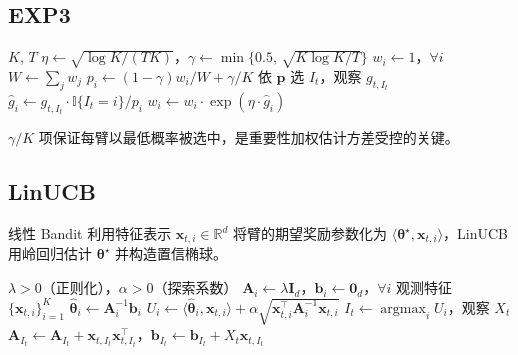 \documentclass[UTF8,a4paper,11pt,zihao=5]{ctexart}
\newcommand{\R}{\mathbb{R}}
\newcommand{\ind}{\mathbb{I}}
\newcommand{\argmax}{\mathop{\arg\max}}
\begin{document}
\subsection{EXP3}

\begin{algorithm}[htbp]
\caption{EXP3}
\label{alg:exp3}
\begin{algorithmic}[1]
\Require $K$, $T$
\State $\eta \leftarrow \sqrt{\log K / (TK)}$，$\gamma \leftarrow \min\{0.5,\, \sqrt{K\log K / T}\}$
\State $w_i \leftarrow 1$，$\forall i$
    \State $W \leftarrow \sum_j w_j$
     \State $p_i \leftarrow (1-\gamma) w_i / W + \gamma/K$ \EndFor
    \State 依 $\bm{p}$ 选 $I_t$，观察 $g_{t,I_t}$
     \State $\hat{g}_i \leftarrow g_{t,I_t} \cdot \ind\{I_t=i\} / p_i$ \EndFor
     \State $w_i \leftarrow w_i \cdot \exp(\eta \cdot \hat{g}_i)$ \EndFor
\EndFor
\end{algorithmic}
\end{algorithm}

$\gamma/K$ 项保证每臂以最低概率被选中，是重要性加权估计方差受控的关键。

\subsection{LinUCB}

线性 Bandit 利用特征表示 $\bm{x}_{t,i} \in \R^d$ 将臂的期望奖励参数化为 $\langle \bm{\theta}^\star, \bm{x}_{t,i} \rangle$，LinUCB 用岭回归估计 $\bm{\theta}^\star$ 并构造置信椭球。

\begin{algorithm}[htbp]
\caption{LinUCB（不相交模型）}
\label{alg:linucb}
\begin{algorithmic}[1]
\Require $\lambda > 0$（正则化），$\alpha > 0$（探索系数）
\State $\bm{A}_i \leftarrow \lambda \bm{I}_d$，$\bm{b}_i \leftarrow \bm{0}_d$，$\forall i$
    \State 观测特征 $\{\bm{x}_{t,i}\}_{i=1}^{K}$
        \State $\hat{\bm{\theta}}_i \leftarrow \bm{A}_i^{-1} \bm{b}_i$
        \State $U_i \leftarrow \langle \hat{\bm{\theta}}_i, \bm{x}_{t,i} \rangle + \alpha\sqrt{\bm{x}_{t,i}^\top \bm{A}_i^{-1} \bm{x}_{t,i}}$
    \EndFor
    \State $I_t \leftarrow \argmax_i U_i$，观察 $X_t$
    \State $\bm{A}_{I_t} \leftarrow \bm{A}_{I_t} + \bm{x}_{t,I_t} \bm{x}_{t,I_t}^\top$，$\bm{b}_{I_t} \leftarrow \bm{b}_{I_t} + X_t \bm{x}_{t,I_t}$
\EndFor
\end{algorithmic}
\end{algorithm}
\end{document}
